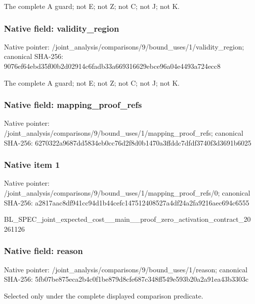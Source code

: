 \documentclass[10pt,a4paper]{article}
\begin{document}
The complete A guard; not E; not Z; not C; not J; not K.


\subsubsection{Native field: validity\_region}


Native pointer: /joint\_analysis/comparis\allowbreak{}ons/9/bound\_uses/1/valid\allowbreak{}ity\_region; canonical SHA-256: 9076ef64ebd35f00b2d02914\allowbreak{}c6fadb33a669316629ebce96\allowbreak{}a04e4493a724ecc8


The complete A guard; not E; not Z; not C; not J; not K.


\subsubsection{Native field: mapping\_proof\_refs}


Native pointer: /joint\_analysis/comparis\allowbreak{}ons/9/bound\_uses/1/mappi\allowbreak{}ng\_proof\_refs; canonical SHA-256: 6270322a9687dd5834eb0cc7\allowbreak{}6d2f8d0b1470a3ffddc7dfdf\allowbreak{}3740f3d3691b6025



\subsubsection{Native item 1}


Native pointer: /joint\_analysis/comparis\allowbreak{}ons/9/bound\_uses/1/mappi\allowbreak{}ng\_proof\_refs/0; canonical SHA-256: a2817aac8df941cc94d1b44c\allowbreak{}efc147512408527a4df24a2f\allowbreak{}a9216aec694c6555


BL\_SPEC\_joint\_expected\_c\allowbreak{}ost\_\_main\_\_proof\_zero\_ac\allowbreak{}tivation\_contract\_202611\allowbreak{}26


\subsubsection{Native field: reason}


Native pointer: /joint\_analysis/comparis\allowbreak{}ons/9/bound\_uses/1/reaso\allowbreak{}n; canonical SHA-256: 5fb07be875eca2b4c0f1be87\allowbreak{}9d8cfe687c348ff549e593b2\allowbreak{}0a2a91ea43b3303c


Selected only under the complete displayed comparison predicate.
\end{document}
